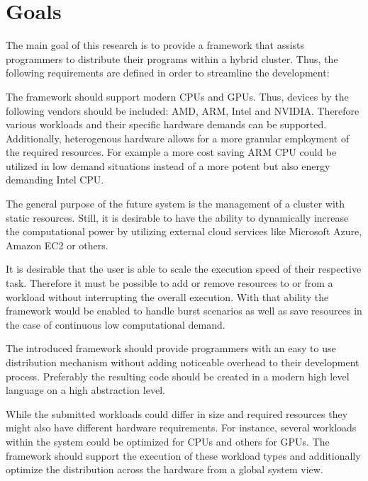 \section{Goals}

The main goal of this research is to provide a framework that assists programmers to distribute their programs within a hybrid cluster. Thus, the following requirements are defined in order to streamline the development:

\begin{description}[style=nextline]
    \item [Heterogeneity]
    The framework should support modern CPUs and GPUs. Thus, devices by the following vendors should be included: AMD, ARM, Intel and NVIDIA. Therefore various workloads and their specific hardware demands can be supported. Additionally, heterogenous hardware allows for a more granular employment of the required resources. For example a more cost saving ARM CPU could be utilized in low demand situations instead of a more potent but also energy demanding Intel CPU.

    \item [Resource Scalability]
    The general purpose of the future system is the management of a cluster with static resources. Still, it is desirable to have the ability to dynamically increase the computational power by utilizing external cloud services like Microsoft Azure, Amazon EC2 or others.

    \item [Scalable Speed]
    It is desirable that the user is able to scale the execution speed of their respective task. Therefore it must be possible to add or remove resources to or from a workload without interrupting the overall execution. With that ability the framework would be enabled to handle burst scenarios as well as save resources in the case of continuous low computational demand.

    \item [Ease of Programming]
    The introduced framework should provide programmers with an easy to use distribution mechanism without adding noticeable overhead to their development process. Preferably the resulting code should be created in a modern high level language on a high abstraction level.

    \item [Workload Diversity]
    While the submitted workloads could differ in size and required resources they might also have different hardware requirements. For instance, several workloads within the system could be optimized for CPUs and others for GPUs. The framework should support the execution of these workload types and additionally optimize the distribution across the hardware from a global system view.


\end{description}
